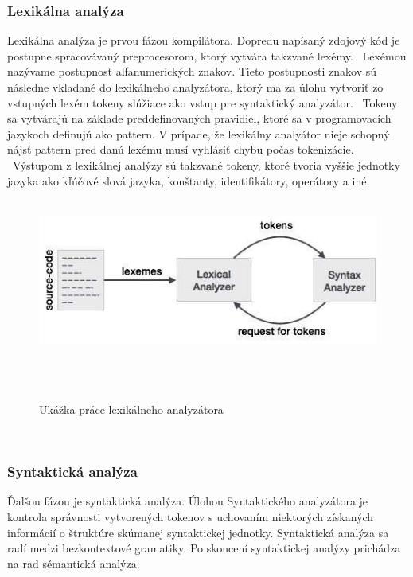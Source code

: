 \subsubsection{Lexikálna analýza}
	\indent Lexikálna analýza je prvou fázou kompilátora. Dopredu napísaný zdojový kód je postupne spracovávaný preprocesorom, ktorý vytvára takzvané lexémy. 
	 \newline Lexémou nazývame postupnosť alfanumerických znakov. Tieto postupnosti znakov sú následne vkladané do lexikálneho analyzátora, ktorý ma za úlohu vytvoriť zo vstupných lexém tokeny slúžiace ako vstup pre syntaktický analyzátor. 
	 \newline Tokeny sa vytvárajú na základe preddefinovaných pravidiel, ktoré sa v programovacích jazykoch definujú ako pattern. V prípade, že lexikálny analyátor nieje schopný nájsť  pattern pred danú lexému musí vyhlásiť chybu počas tokenizácie.  
	 \newline Výstupom z lexikálnej analýzy sú takzvané tokeny, ktoré tvoria vyššie jednotky jazyka ako kľúčové slová jazyka, konštanty, identifikátory, operátory a iné.\cite{gram}
	 
	 \begin{figure}[!htbp]
	 	\centering
	 	\includegraphics[width=15cm]{img/lexical_analysis.jpg}
	 	\caption{Ukážka práce lexikálneho analyzátora}
	 	\label{fig:test}
	 \end{figure}
 \newline
 
\subsubsection{Syntaktická analýza}
\indent Ďalšou fázou je syntaktická analýza. Úlohou Syntaktického analyzátora je kontrola správnosti vytvorených tokenov s uchovaním niektorých získaných informácií o štruktúre skúmanej syntaktickej jednotky. Syntaktická analýza sa radí medzi bezkontextové gramatiky. Po skoncení syntaktickej analýzy prichádza na rad sémantická analýza.\cite{gram}

